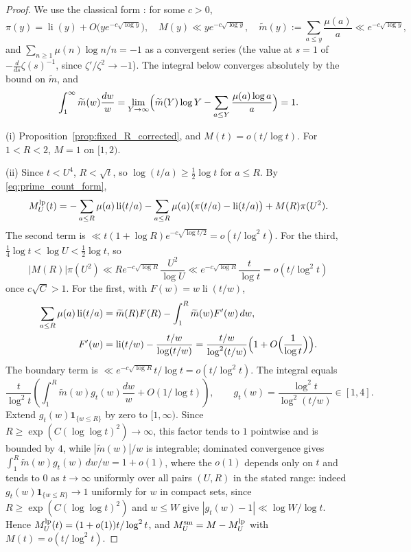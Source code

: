 \documentclass[11pt]{amsart}
\numberwithin{equation}{section}
\theoremstyle{plain}
\theoremstyle{definition}
\theoremstyle{remark}
\DeclareMathOperator{\li}{li}
\newcommand{\mt}{\widetilde{m}}
\begin{document}
\begin{proof}
We use the classical form \cite{MontgomeryVaughan2007}: for some $c>0$,
\begin{equation}
\label{eq:pnt_inputs}
  \pi(y)=\li(y)+O\bigl(ye^{-c\sqrt{\log y}}\bigr),\quad
  M(y)\ll ye^{-c\sqrt{\log y}},\quad
  \mt(y):=\sum_{a\le y}\frac{\mu(a)}a\ll e^{-c\sqrt{\log y}},
\end{equation}
and $\sum_{n\ge1}\mu(n)\log n/n=-1$ as a convergent series (the value at
$s=1$ of $-\frac{d}{ds}\zeta(s)^{-1}$, since $\zeta'/\zeta^2\to-1$). The
integral below converges absolutely by the bound on $\mt$, and
\begin{equation}
\label{eq:mtilde_integral}
  \int_1^\infty\mt(w)\frac{dw}w
  =\lim_{Y\to\infty}\Bigl(\mt(Y)\log Y-\sum_{a\le Y}\frac{\mu(a)\log a}a\Bigr)=1.
\end{equation}

(i) Proposition~\ref{prop:fixed_R_corrected}, and $M(t)=o(t/\log t)$. For
$1<R<2$, $M=1$ on $[1,2)$.

(ii) Since $t<U^4$, $R<\sqrt t$, so $\log(t/a)\ge\frac12\log t$ for $a\le R$.
By \eqref{eq:prime_count_form},
\begin{equation}
\label{eq:E_three_terms}
  M^{\rm lp}_U(t)=-\sum_{a\le R}\mu(a)\li(t/a)
  -\sum_{a\le R}\mu(a)\bigl(\pi(t/a)-\li(t/a)\bigr)+M(R)\pi(U^2).
\end{equation}
The second term is $\ll t(1+\log R)e^{-c\sqrt{\log t/2}}=o(t/\log^2t)$. For
the third, $\tfrac14\log t<\log U<\tfrac12\log t$, so
\[
|M(R)|\pi(U^2)\ll Re^{-c\sqrt{\log R}}\frac{U^2}{\log U}
\ll e^{-c\sqrt{\log R}}\frac{t}{\log t}=o(t/\log^2t)
\]
once $c\sqrt C>1$. For the first, with $F(w)=w\li(t/w)$,
\begin{align}
\label{eq:partial_summation_li}
  \sum_{a\le R}\mu(a)\li(t/a)
  &=\mt(R)F(R)-\int_1^R\mt(w)F'(w)\,dw,\\
  F'(w)&=\li(t/w)-\frac{t/w}{\log(t/w)}
  =\frac{t/w}{\log^2(t/w)}\Bigl(1+O\Bigl(\frac1{\log t}\Bigr)\Bigr).\notag
\end{align}
The boundary term is $\ll e^{-c\sqrt{\log R}}t/\log t=o(t/\log^2t)$. The
integral equals
\[
\frac t{\log^2t}\left(\int_1^R\mt(w)g_t(w)\frac{dw}w+O(1/\log t)\right),
\qquad
g_t(w)=\frac{\log^2t}{\log^2(t/w)}\in[1,4].
\]
Extend $g_t(w)\mathbf1_{\{w\le R\}}$ by zero to $[1,\infty)$. Since
$R\ge\exp(C(\log\log t)^2)\to\infty$, this factor tends to $1$ pointwise and is
bounded by $4$, while $|\mt(w)|/w$ is integrable; dominated convergence gives
$\int_1^R\mt(w)g_t(w)\,dw/w=1+o(1)$, where the $o(1)$ depends only on $t$
and tends to $0$ as $t\to\infty$ uniformly over all pairs $(U,R)$ in the
stated range: indeed $g_t(w)\mathbf 1_{\{w\le R\}}\to1$ uniformly for $w$ in
compact sets, since $R\ge\exp(C(\log\log t)^2)$ and $w\le W$ give
$|g_t(w)-1|\ll\log W/\log t$. Hence
$M^{\rm lp}_U(t)=(1+o(1))t/\log^2t$, and $M^{\rm sm}_U=M-M^{\rm lp}_U$ with $M(t)=o(t/\log^2t)$.
\end{proof}
\end{document}

